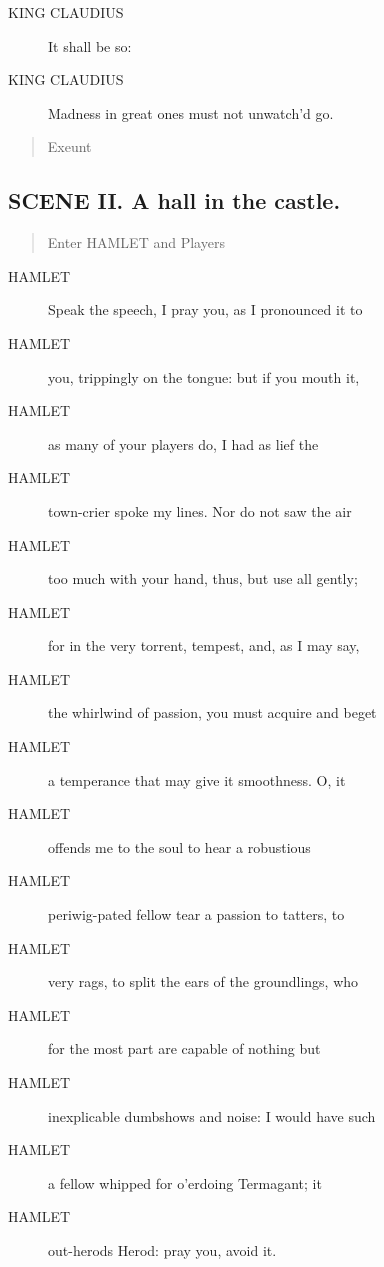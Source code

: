 \documentclass{article}
\begin{document}
\begin{description}
            
\item[KING CLAUDIUS] It shall be so:
\item[KING CLAUDIUS] Madness in great ones must not unwatch'd go.
\end{description}
          
\begin{quote}
Exeunt
\end{quote}
          
\subsection{SCENE II.  A hall in the castle.}
          
\begin{quote}
Enter HAMLET and Players
\end{quote}
          
\begin{description}
            
\item[HAMLET] Speak the speech, I pray you, as I pronounced it to
\item[HAMLET] you, trippingly on the tongue: but if you mouth it,
\item[HAMLET] as many of your players do, I had as lief the
\item[HAMLET] town-crier spoke my lines. Nor do not saw the air
\item[HAMLET] too much with your hand, thus, but use all gently;
\item[HAMLET] for in the very torrent, tempest, and, as I may say,
\item[HAMLET] the whirlwind of passion, you must acquire and beget
\item[HAMLET] a temperance that may give it smoothness. O, it
\item[HAMLET] offends me to the soul to hear a robustious
\item[HAMLET] periwig-pated fellow tear a passion to tatters, to
\item[HAMLET] very rags, to split the ears of the groundlings, who
\item[HAMLET] for the most part are capable of nothing but
\item[HAMLET] inexplicable dumbshows and noise: I would have such
\item[HAMLET] a fellow whipped for o'erdoing Termagant; it
\item[HAMLET] out-herods Herod: pray you, avoid it.
\end{description}
          
\end{document}
